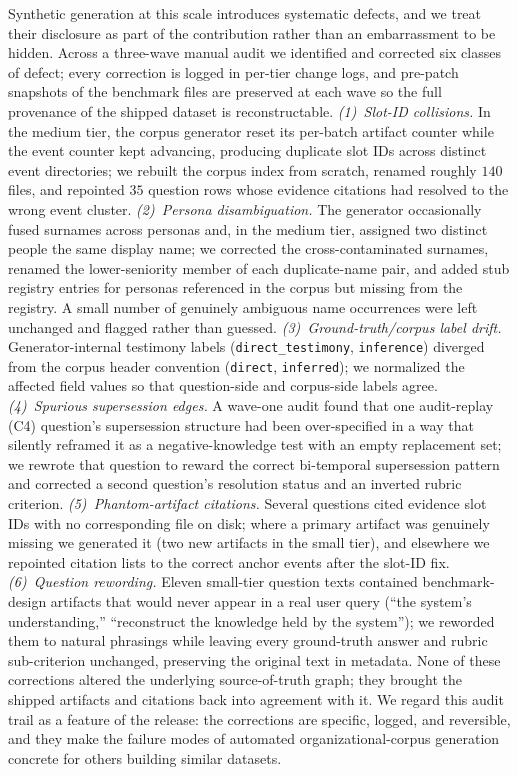 Synthetic generation at this scale introduces systematic defects, and we treat
their disclosure as part of the contribution rather than an embarrassment to
be hidden. Across a three-wave manual audit we identified and corrected six
classes of defect; every correction is logged in per-tier change logs, and
pre-patch snapshots of the benchmark files are preserved at each wave so the
full provenance of the shipped dataset is reconstructable.
%
\emph{(1)~Slot-ID collisions.} In the medium tier, the corpus generator reset
its per-batch artifact counter while the event counter kept advancing,
producing duplicate slot IDs across distinct event directories; we rebuilt the
corpus index from scratch, renamed roughly $140$ files, and repointed $35$
question rows whose evidence citations had resolved to the wrong event cluster.
%
\emph{(2)~Persona disambiguation.} The generator occasionally fused surnames
across personas and, in the medium tier, assigned two distinct people the same
display name; we corrected the cross-contaminated surnames, renamed the
lower-seniority member of each duplicate-name pair, and added stub registry
entries for personas referenced in the corpus but missing from the registry.
A small number of genuinely ambiguous name occurrences were left unchanged and
flagged rather than guessed.
%
\emph{(3)~Ground-truth/corpus label drift.} Generator-internal testimony labels
(\texttt{direct\_testimony}, \texttt{inference}) diverged from the corpus header
convention (\texttt{direct}, \texttt{inferred}); we normalized the affected
field values so that question-side and corpus-side labels agree.
%
\emph{(4)~Spurious supersession edges.} A wave-one audit found that one
audit-replay (C4) question's supersession structure had been over-specified in
a way that silently reframed it as a negative-knowledge test with an empty
replacement set; we rewrote that question to reward the correct bi-temporal
supersession pattern and corrected a second question's resolution status and an
inverted rubric criterion.
%
\emph{(5)~Phantom-artifact citations.} Several questions cited evidence slot IDs
with no corresponding file on disk; where a primary artifact was genuinely
missing we generated it (two new artifacts in the small tier), and elsewhere we
repointed citation lists to the correct anchor events after the slot-ID fix.
%
\emph{(6)~Question rewording.} Eleven small-tier question texts contained
benchmark-design artifacts that would never appear in a real user query
(``the system's understanding,'' ``reconstruct the knowledge held by the
system''); we reworded them to natural phrasings while leaving every
ground-truth answer and rubric sub-criterion unchanged, preserving the original
text in metadata.
%
None of these corrections altered the underlying source-of-truth graph; they
brought the shipped artifacts and citations back into agreement with it. We
regard this audit trail as a feature of the release: the corrections are
specific, logged, and reversible, and they make the failure modes of automated
organizational-corpus generation concrete for others building similar datasets.
